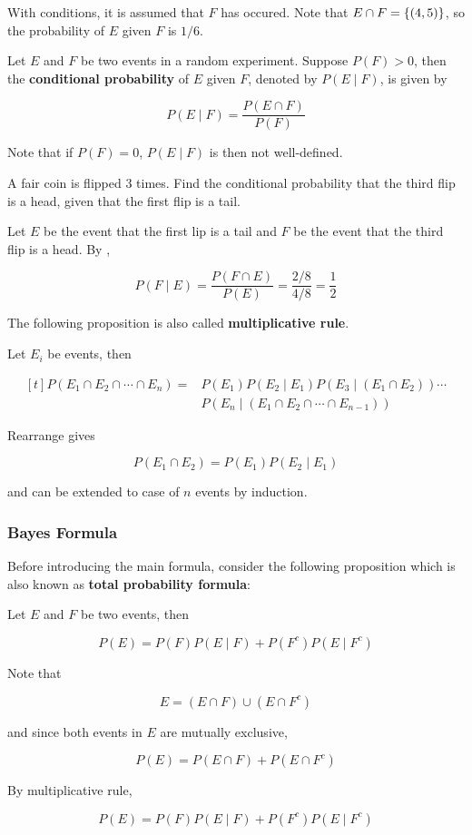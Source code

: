 \documentclass[a4paper,12pt]{article}
\begin{document}
With conditions, it is assumed that $F$ has occured. Note that $E\cap F=\left\{ (4,5)\right\}$, so the probability of $E$ given $F$ is $1/6$.\n

\begin{dft}
  Let $E$ and $F$ be two events in a random experiment. Suppose $P(F)>0$, then the \textbf{conditional probability} of $E$ given $F$, denoted by $P(E\mid F)$, is given by

  $$P(E\mid F)=\frac{P(E\cap F)}{P(F)}$$
\end{dft}\n

Note that if $P(F)=0$, $P(E\mid F)$ is then not well-defined.\n

\begin{exm}
  A fair coin is flipped $3$ times. Find the conditional probability that the third flip is a head, given that the first flip is a tail.\n

  \ans Let $E$ be the event that the first lip is a tail and $F$ be the event that the third flip is a head. By \rdft[\sctd{1}],

  $$P(F\mid E)=\frac{P(F\cap E)}{P(E)}=\frac{2/8}{4/8}=\frac{1}{2}$$\s
\end{exm}\n

The following proposition is also called \textbf{multiplicative rule}.\n

\begin{pst}
  Let $E_{i}$ be events, then

  $$\begin{aligned}[t]
    P(E_{1}\cap E_{2}\cap\cdots\cap E_{n})=&P(E_{1})P(E_{2}\mid E_{1})P(E_{3}\mid(E_{1}\cap E_{2}))\cdots\\
    &P(E_{n}\mid(E_{1}\cap E_{2}\cap\cdots\cap E_{n-1}))
  \end{aligned}$$\s

  \prf Rearrange \rdft[\sctd{2}] gives

  $$P(E_{1}\cap E_{2})=P(E_{1})P(E_{2}\mid E_{1})$$\s

  and can be extended to case of $n$ events by induction.
\end{pst}

\subsubsection{Bayes Formula}
Before introducing the main formula, consider the following proposition which is also known as \textbf{total probability formula}:\n

\begin{pst}
  Let $E$ and $F$ be two events, then

  $$P(E)=P(F)P(E\mid F)+P(F^{c})P(E\mid F^{c})$$\s

  \prf Note that

  $$E=(E\cap F)\cup(E\cap F^{c})$$\s

  and since both events in $E$ are mutually exclusive,

  $$P(E)=P(E\cap F)+P(E\cap F^{c})$$\s

  By multiplicative rule,

  $$P(E)=P(F)P(E\mid F)+P(F^{c})P(E\mid F^{c})$$
\end{pst}\n
\end{document}
